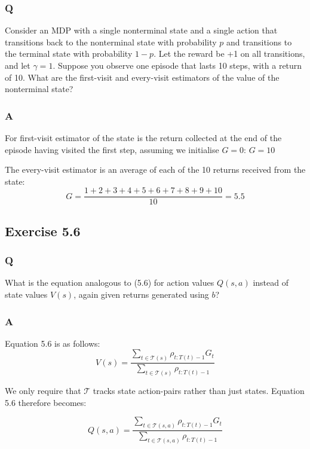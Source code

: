 \subsubsection{Q}
Consider an MDP with a single nonterminal state and a single action that transitions back to the nonterminal state with probability $p$ and transitions to the terminal state with probability $1 - p$. Let the reward be +1 on all transitions, and let $\gamma = 1$. Suppose you observe one episode that lasts 10 steps, with a return of 10. What are the first-visit and every-visit estimators of the value of the nonterminal state?
\subsubsection{A}
For first-visit estimator of the state is the return collected at the end of the episode having visited the first step, assuming we initialise $G=0$:
$
G = 10
$

The every-visit estimator is an average of each of the 10 returns received from the state:
\begin{equation}
G = \frac{1+2+3+4+5+6+7+8+9+10}{10} = 5.5
\end{equation}

\subsection{Exercise 5.6}
\subsubsection{Q}
What is the equation analogous to (5.6) for action values $Q(s,a)$ instead of state values $V(s)$, again given returns generated using $b$?
\subsubsection{A}
Equation 5.6 is as follows:
\begin{equation}
V(s) = \frac{\sum_{t \in \mathcal{T}(s)} \rho_{t:T(t)-1} G_t}{\sum_{t \in \mathcal{T}(s)} \rho_{t:T(t)-1}}
\end{equation}

We only require that $\mathcal{T}$ tracks state action-pairs rather than just states. Equation 5.6 therefore becomes: 

\begin{equation}
Q(s,a) = \frac{\sum_{t \in \mathcal{T}(s,a)} \rho_{t:T(t)-1} G_t}{\sum_{t \in \mathcal{T}(s,a)} \rho_{t:T(t)-1}}
\end{equation}

